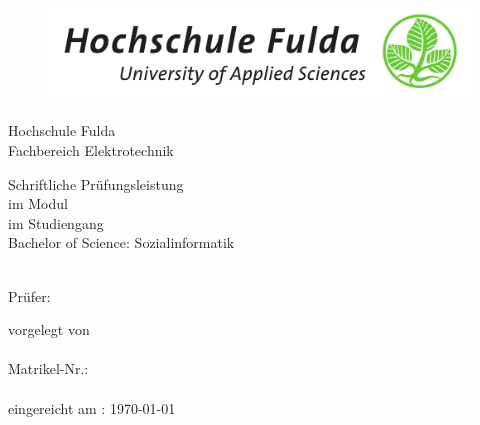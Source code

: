 \begin{titlepage}
\begin{figure}
  \centering
  \includegraphics[width=1.0\textwidth]{res/hs_fulda_logo.png}
\end{figure}
    \centering
    Hochschule Fulda \\    Fachbereich Elektrotechnik
    \vspace{1.5cm}

    {\Huge \bfseries \titel \par}
    {\Large \itshape \untertitel \par}
    \vspace{2.5cm}

    Schriftliche Prüfungsleistung\\ im Modul
    \modulname\\
    im Studiengang\\ Bachelor of Science: Sozialinformatik \\
    \vspace{0.7cm}

    \semester\\

    \vspace{3cm}
    Prüfer: \pruefer\\

    \vfill

    vorgelegt von \\ \vorname\:\nachname \\ Matrikel-Nr.: \matrikelnummer \\ \emailadresse \\ eingereicht am : \today
\restoregeometry
\end{titlepage}
